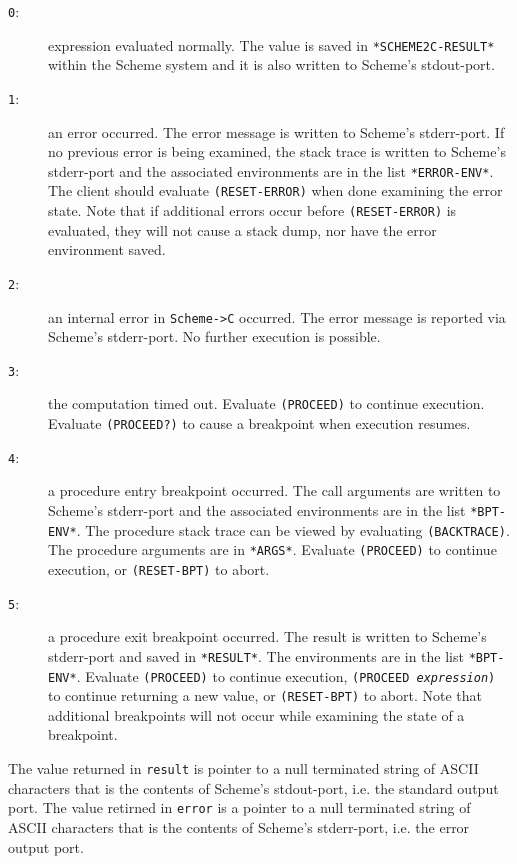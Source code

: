 \documentclass[12pt]{article}
\begin{document}
\begin{description}
\item[\texttt{0}:] expression evaluated normally.  The value is saved in
\texttt{*SCHEME2C-RESULT*} within the Scheme system  and it is also
written to Scheme's stdout-port.

\item[\texttt{1}:] an error occurred.  The error message is written to Scheme's
stderr-port.  If no previous error is being examined, the stack trace
is written to Scheme's stderr-port and the associated environments
are in the list \texttt{*ERROR-ENV*}.  The client should evaluate
\texttt{(RESET-ERROR)} when done examining the error state.  Note that if
additional errors occur before \texttt{(RESET-ERROR)} is evaluated, they
will not cause a stack dump, nor have the error environment saved.

\item[\texttt{2}:] an internal error in \texttt{Scheme->C} occurred.  The error
message is reported via Scheme's stderr-port.  No further execution
is possible.

\item[\texttt{3}:] the computation timed out.  Evaluate \texttt{(PROCEED)} to continue
execution.  Evaluate \texttt{(PROCEED?)} to cause a breakpoint  when execution
resumes.

\item[\texttt{4}:] a procedure entry breakpoint occurred.  The call arguments are
written to Scheme's stderr-port and the associated environments are
in the list \texttt{*BPT-ENV*}. The procedure stack trace can be viewed by
evaluating \texttt{(BACKTRACE)}.   The procedure arguments are in
\texttt{*ARGS*}. Evaluate \texttt{(PROCEED)} to continue execution, or
\texttt{(RESET-BPT)} to abort.

\item[\texttt{5}:] a procedure exit breakpoint occurred.  The result is written
to Scheme's stderr-port and saved in \texttt{*RESULT*}.  The environments
are in the list \texttt{*BPT-ENV*}.  Evaluate \texttt{(PROCEED)} to continue
execution, \texttt{(PROCEED \textnormal{\emph{expression}})} to continue returning a
new value, or \texttt{(RESET-BPT)} to abort.  Note that additional
breakpoints will not occur while examining the state of a breakpoint.
\end{description}

The value returned in \texttt{result} is pointer to a null terminated
string of ASCII characters that is the contents of Scheme's
stdout-port, i.e. the standard output port.  The value retirned in
\texttt{error} is a pointer to a null terminated string of ASCII
characters that is the contents of Scheme's stderr-port, i.e. the
error output port.
\end{document}
